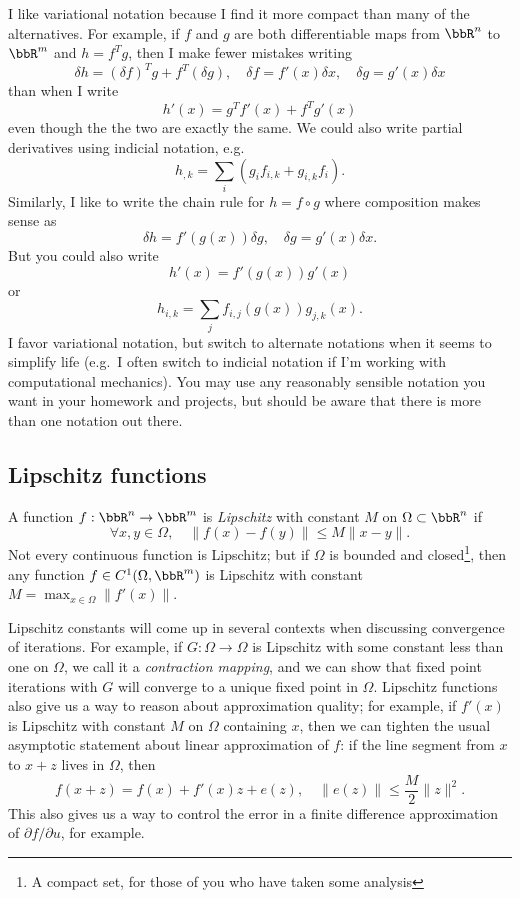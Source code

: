 \documentclass[12pt, leqno]{article} %
\begin{document}
I like variational notation because I find it more compact than many
of the alternatives.  For example, if $f$ and $g$ are both
differentiable maps from $\bbR^n$ to $\bbR^m$ and $h = f^T g$,
then I make fewer mistakes writing
\[
\delta h = (\delta f)^T g + f^T (\delta g), \quad
\delta f = f'(x) \delta x, \quad \delta g = g'(x) \delta x
\]
than when I write
\[
  h'(x) = g^T f'(x) + f^T g'(x)
\]
even though the the two are exactly the same.  We could also
write partial derivatives using indicial notation, e.g.
\[
  h_{,k} = \sum_{i} (g_i f_{i,k} + g_{i,k} f_i).
\]
Similarly, I like to write the chain rule for $h = f \circ g$
where composition makes sense as
\[
  \delta h = f'(g(x)) \delta g, \quad
  \delta g = g'(x) \delta x.
\]
But you could also write
\[
  h'(x) = f'(g(x)) g'(x)
\]
or
\[
  h_{i,k} = \sum_{j} f_{i,j}(g(x)) g_{j,k}(x).
\]
I favor variational notation, but switch to alternate notations when
it seems to simplify life (e.g.~I often switch to indicial notation if
I'm working with computational mechanics).
You may use any reasonably sensible notation you want in your homework
and projects, but should be aware that there is more than one notation
out there.

\subsection*{Lipschitz functions}

A function $f : \bbR^n \rightarrow \bbR^m$ is
{\em Lipschitz} with constant $M$ on $\Omega \subset \bbR^n$ if
\[
  \forall x, y \in \Omega, \quad \|f(x)-f(y)\| \leq M\|x-y\|.
\]
Not every continuous function is Lipschitz; but if $\Omega$ is bounded
and closed\footnote{A compact set, for those of you who have taken
  some analysis}, then any function $f \in C^1(\Omega, \bbR^m)$ is
Lipschitz with constant $M = \max_{x \in \Omega} \|f'(x)\|$.

Lipschitz constants will come up in several contexts when
discussing convergence of iterations.  For example,
if $G : \Omega \rightarrow \Omega$ is Lipschitz with some constant
less than one on $\Omega$, we call it a {\em contraction mapping},
and we can show that fixed point iterations with $G$ will converge
to a unique fixed point in $\Omega$.  Lipschitz functions also give
us a way to reason about approximation quality; for example, if
$f'(x)$ is Lipschitz with constant $M$ on $\Omega$ containing $x$, then
we can tighten the usual asymptotic statement about linear
approximation of $f$: if the line segment from $x$ to $x+z$ lives in
$\Omega$, then
\[
  f(x+z) = f(x) + f'(x) z + e(z), \quad \|e(z)\| \leq \frac{M}{2} \|z\|^2.
\]
This also gives us a way to control the error in a finite difference
approximation of $\partial f/\partial u$, for example.
\end{document}
